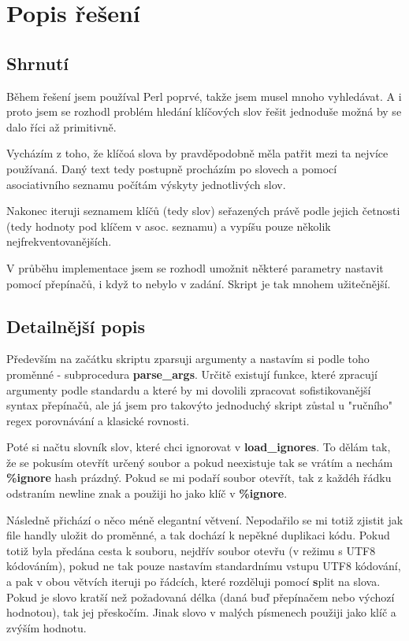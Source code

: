 \documentclass{article}
\author{Jan Rychlý}
\date{20. 11. 2020}
\def\cmd{\fontfamily{lmtt}\selectfont\textbf} %
\begin{document}
\section*{Popis řešení}

\subsection*{Shrnutí}
\indent
\par Během řešení jsem používal Perl poprvé,
takže jsem musel mnoho vyhledávat. A i proto jsem se rozhodl
problém hledání klíčových slov řešit jednoduše možná by se dalo
říci až primitivně.
\par Vycházím z toho, že klíčoá slova by pravděpodobně měla
patřit mezi ta nejvíce používaná. Daný text tedy postupně procházím
po slovech a pomocí asociativního seznamu počítám výskyty
jednotlivých slov.
\par Nakonec iteruji seznamem klíčů (tedy slov) seřazených právě
podle jejich četnosti (tedy hodnoty pod klíčem v asoc. seznamu)
a vypíšu pouze několik nejfrekventovanějších.
\par V průběhu implementace jsem se rozhodl umožnit některé
parametry nastavit pomocí přepínačů, i když to nebylo v zadání.
Skript je tak mnohem užitečnější.

\subsection*{Detailnější popis}
\indent
\par Především na začátku skriptu zparsuji argumenty a nastavím
si podle toho proměnné - subprocedura {\cmd {parse\_args}}. Určitě
existují funkce, které zpracují argumenty podle standardu a které
by mi dovolili zpracovat sofistikovanější syntax přepínačů, ale
já jsem pro takovýto jednoduchý skript zůstal u "ručního"
regex porovnávání a klasické rovnosti.

\par Poté si načtu slovník slov, které chci ignorovat v
{\cmd{load\_ignores}}. To dělám tak, že se pokusím otevřít
určený soubor a pokud neexistuje tak se vrátím a nechám
{\cmd {\%ignore}} hash prázdný. Pokud se mi podaří soubor otevřít, 
tak z každéh řádku odstraním newline znak a použiji ho jako klíč
v {\cmd {\%ignore}}.

\par Následně přichází o něco méně elegantní větvení. Nepodařilo se
mi totiž zjistit jak file handly uložit do proměnné, a tak dochází
k nepěkné duplikaci kódu. Pokud totiž byla předána cesta k souboru,
nejdřív soubor otevřu (v režimu s UTF8 kódováním), pokud ne tak
pouze nastavím standardnímu vstupu UTF8 kódování, a pak v obou
větvích iteruji po řádcích, které rozděluji pomocí {\cmd split}
na slova. Pokud je slovo kratší než požadovaná délka (daná buď 
přepínačem nebo výchozí hodnotou), tak jej přeskočím. Jinak
slovo v malých písmenech použiji jako klíč a zvýším hodnotu.
\end{document}
